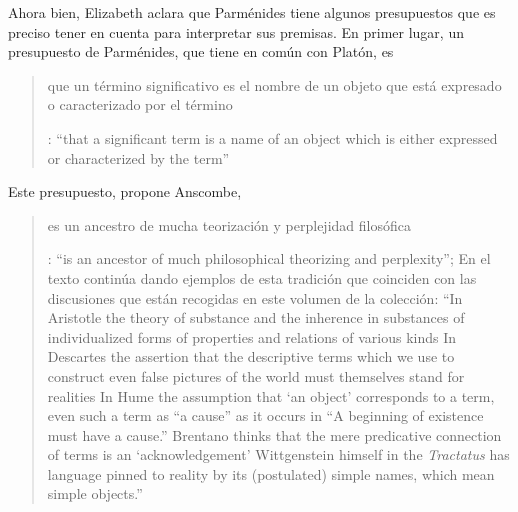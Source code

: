 Ahora bien, Elizabeth aclara que Parménides tiene algunos presupuestos que es preciso tener en cuenta para interpretar sus premisas. En primer lugar, un presupuesto de Parménides, que tiene en común con Platón, es \blockquote[{\cite[x]{anscombe1981parmenides}}: \enquote{that a significant term is a name of an object which is either expressed or characterized by the term}]{que un término significativo es el nombre de un objeto que está expresado o caracterizado por el término}. Este presupuesto, propone Anscombe, \blockquote[{\cite[xi]{anscombe1981parmenides}}: \enquote{is an ancestor of much philosophical theorizing and perplexity}; En el texto continúa dando ejemplos de esta tradición que coinciden con las discusiones que están recogidas en este volumen de la colección: \enquote{In Aristotle \textelp{} the theory of substance and the inherence in substances of individualized forms of properties and relations of various kinds \textelp{} In Descartes \textelp{} the assertion that the descriptive terms which we use to construct even false pictures of the world must themselves stand for realities \textelp{} In Hume \textelp{} the assumption that `an object' corresponds to a term, even such a term as ``a cause'' as it occurs in ``A beginning of existence must have a cause.'' \textelp{} Brentano thinks that the mere predicative connection of terms is an `acknowledgement' \textelp{} Wittgenstein himself in the \emph{Tractatus} has language pinned to reality by its (postulated) simple names, which mean simple objects.}]{es un ancestro de mucha teorización y perplejidad filosófica}.
